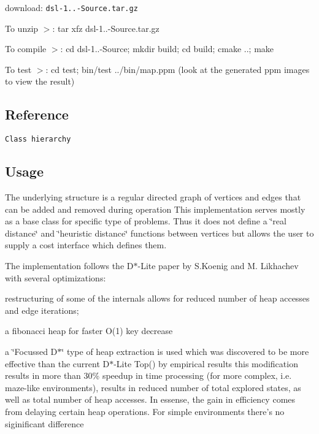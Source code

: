 \begin{DoxyItemize}
\item download\-: {\tt dsl-\/1..-\/\-Source.\-tar.\-gz}
\item \-To unzip $>$\-: tar xfz dsl-\/1..-\/\-Source.\-tar.\-gz
\item \-To compile $>$\-: cd dsl-\/1..-\/\-Source; mkdir build; cd build; cmake ..; make
\item \-To test $>$\-: cd test; bin/test ../bin/map.ppm (look at the generated ppm images to view the result)
\end{DoxyItemize}\subsection{\-Reference}\label{index_Class}
{\tt \-Class hierarchy}\subsection{\-Usage}\label{index_Usage}
\-The underlying structure is a regular directed graph of vertices and edges that can be added and removed during operation \-This implementation serves mostly as a base class for specific type of problems. \-Thus it does not define a \char`\"{}real distance\char`\"{} and \char`\"{}heuristic distance\char`\"{} functions between vertices but allows the user to supply a cost interface which defines them.

\-The implementation follows the \-D$\ast$-\/\-Lite paper by \-S.\-Koenig and \-M. \-Likhachev with several optimizations\-:


\begin{DoxyItemize}
\item restructuring of some of the internals allows for reduced number of heap accesses and edge iterations;
\item a fibonacci heap for faster \-O(1) key decrease
\item a \char`\"{}\-Focussed D$\ast$\char`\"{} type of heap extraction is used which was discovered to be more effective than the current \-D$\ast$-\/\-Lite \-Top() by empirical results this modification results in more than 30\% speedup in time processing (for more complex, i.\-e. maze-\/like environments), results in reduced number of total explored states, as well as total number of heap accesses. \-In essense, the gain in efficiency comes from delaying certain heap operations. \-For simple environments there's no siginificant difference
\end{DoxyItemize}

